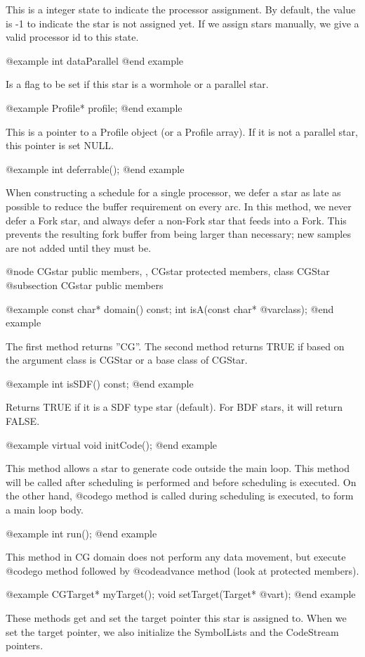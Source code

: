 This is a integer state to indicate the processor assignment. By default,
the value is -1 to indicate the star is not assigned yet. If we assign
stars manually, we give a valid processor id to this state.

@example
int dataParallel
@end example

Is a flag to be set if this star is a wormhole or a parallel star.

@example
Profile* profile;
@end example

This is a pointer to a Profile object (or a Profile array). If it is not
a parallel star, this pointer is set NULL.

@example
int deferrable();
@end example

When constructing a schedule for a single processor, we defer a star
as late as possible to reduce the buffer requirement on every arc.
In this method, we never defer a Fork star, and always defer a non-Fork
star that feeds into a Fork. This prevents the resulting fork buffer
from being larger than necessary; new samples are not added until they must be.

@node CGstar public members, , CGstar protected members, class CGStar
@subsection CGstar public members

@example
const char* domain() const;
int isA(const char* @var{class});
@end example

The first method returns ''CG''. The second method returns TRUE if
based on the argument class is CGStar or a base class of CGStar.

@example
int isSDF() const;
@end example

Returns TRUE if it is a SDF type star (default). For BDF stars, 
it will return FALSE.

@example
virtual void initCode();
@end example

This method allows a star to generate code outside the main loop.
This method will be called after scheduling is performed and before
scheduling is executed. On the other hand, @code{go} method is called
during scheduling is executed, to form a main loop body.

@example
int run();
@end example

This method in CG domain does not perform any data movement, but
execute @code{go} method followed by @code{advance} method (look at
protected members).

@example
CGTarget* myTarget();
void setTarget(Target* @var{t});
@end example

These methods get and set the target pointer this star is assigned to.
When we set the target pointer, we also initialize the SymbolLists and
the CodeStream pointers.

